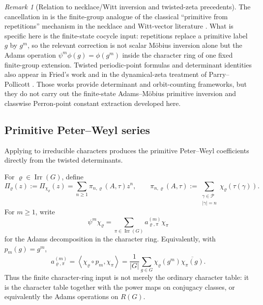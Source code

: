 \documentclass[11pt,a4paper]{amsart}
\theoremstyle{plain}
\theoremstyle{definition}
\theoremstyle{remark}
\newtheorem{remark}[theorem]{Remark}
\DeclareMathOperator{\Irr}{Irr}
\newcommand{\cP}{\mathcal P}
\begin{document}
\begin{remark}[Relation to necklace/Witt inversion and twisted-zeta
  precedents]
  \label{rem:adams-mobius-literature-position}
  The cancellation in
   is the finite-group analogue
  of the classical ``primitive from repetitions'' mechanism in the
  necklace and Witt-vector literature
  \cite{MetropolisRota1983Necklaces,Wehrhahn1990AperiodicRings}. What
  is specific here is the finite-state cocycle input:
  repetitions replace a primitive label \(g\) by \(g^m\), so the
  relevant correction is not scalar M\"obius inversion alone but the
  Adams operation \(\psi^m\phi(g)=\phi(g^m)\) inside the character ring
  of one fixed finite-group extension. Twisted periodic-point formulas
  and determinant identities also appear in Fried's work
  \cite{Fried1983PeriodicPointsTwistedCoefficients,Fried1983HomologicalIdentitiesClosedOrbits} and in the dynamical-zeta
  treatment of Parry--Pollicott \cite{ParryPollicott1990Zeta}. Those
  works provide determinant and orbit-counting frameworks, but they do
  not carry out the finite-state Adams--M\"obius primitive inversion and
  classwise Perron-point constant extraction developed here.
\end{remark}
\subsection{Primitive Peter--Weyl series}

Applying  to irreducible
characters produces the primitive Peter--Weyl coefficients directly
from the twisted determinants.

For \(\varrho\in\Irr(G)\), define
\begin{equation}\label{eq:primitive-peter-weyl-series}
  \Pi_\varrho(z):=\Pi_{\chi_\varrho}(z)
  =\sum_{n\ge 1}\pi_{n,\varrho}(A,\tau)z^n,
  \qquad
  \pi_{n,\varrho}(A,\tau)
  :=\sum_{\substack{\gamma\in\cP\\ |\gamma|=n}}
    \chi_\varrho(\tau(\gamma)).
\end{equation}
For \(m\ge 1\), write
\begin{equation}\label{eq:adams-character-decomposition}
  \psi^m\chi_\varrho
  =\sum_{\pi\in\Irr(G)}a_{\varrho,\pi}^{(m)}\chi_\pi
\end{equation}
for the Adams decomposition in the character ring. Equivalently, with
\(p_m(g)=g^m\),
\begin{equation}\label{eq:adams-coefficient-inner-product}
  a_{\varrho,\pi}^{(m)}
  =
  \left\langle \chi_\varrho\circ p_m,\chi_\pi\right\rangle
  =
  \frac{1}{|G|}\sum_{g\in G}
    \chi_\varrho(g^m)\overline{\chi_\pi(g)}.
\end{equation}
Thus the finite character-ring input is not merely the ordinary
character table: it is the character table together with the power maps
on conjugacy classes, or equivalently the Adams operations on \(R(G)\).
\end{document}
